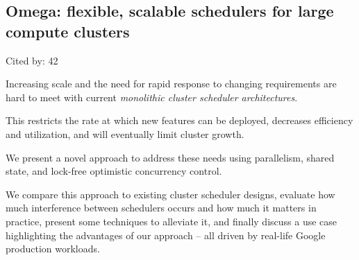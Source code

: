 \documentclass[a4paper,11pt]{article}
\begin{document}
\subsection*{Omega: flexible, scalable schedulers for large compute clusters}
{\color{cyan} {\color{magenta} Cited by: 42}

Increasing scale and the need for rapid response to changing requirements 
are hard to meet with current 
{\color{red} \em monolithic cluster scheduler architectures}.

This 
restricts the rate at which new features can be deployed, 
decreases efficiency and utilization, and will eventually 
limit cluster growth.

We present
{\color{black} a novel approach\cite{omega}}
to address these needs using 
parallelism, shared state, and lock-free optimistic concurrency control.

We 
compare this approach to existing cluster scheduler designs, 
evaluate how much interference between schedulers occurs and how much it matters in practice, 
present some techniques to alleviate it, and finally 
discuss a use case highlighting the advantages of our approach – 
all driven by real-life Google production workloads.

}
\end{document}

